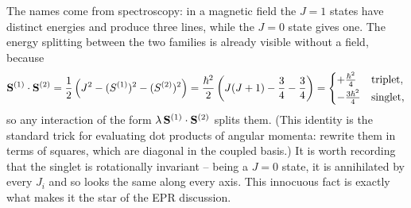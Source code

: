 \documentclass[a4paper]{scrartcl}
\begin{document}
\begin{center}
\end{center}

The names come from spectroscopy: in a magnetic field the $J=1$ states have distinct energies and produce three lines, while the $J=0$ state gives one. The energy splitting between the two families is already visible without a field, because
$$
\mathbf{S}^{(1)}\cdot \mathbf{S}^{(2)} = \frac{1}{2}\left( J^2 - (S^{(1)})^2 - (S^{(2)})^2 \right) = \frac{\hbar^2}{2}\left( J(J+1) - \frac34 - \frac34 \right)
= \begin{cases} +\frac{\hbar^2}{4} & \text{triplet},\\[2pt] -\frac{3\hbar^2}{4} & \text{singlet},\end{cases}
$$
so any interaction of the form $\lambda\, \mathbf{S}^{(1)}\cdot\mathbf{S}^{(2)}$ splits them. (This identity is the standard trick for evaluating dot products of angular momenta: rewrite them in terms of squares, which are diagonal in the coupled basis.) It is worth recording that the singlet is rotationally invariant -- being a $J=0$ state, it is annihilated by every $J_i$ and so looks the same along every axis. This innocuous fact is exactly what makes it the star of the EPR discussion.
\end{document}
